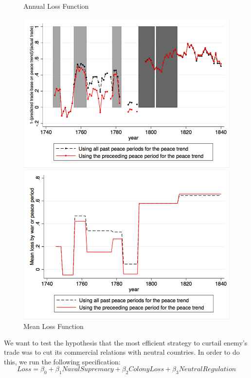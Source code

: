 \documentclass[12pt,a4paper,notitlepage,english]{article}
\begin{document}
\begin{center}
\begin{figure}[H]
\caption{Annual Loss Function}
\label{annual_loss_function}
\includegraphics[scale=.425]{Annual_loss_function.png}
\caption{Mean Loss Function}
\label{mean_loss_function}
\includegraphics[scale=.4]{Mean_loss_function.png}
\end{figure}
\end{center}
We want to test the hypothesis that the most efficient strategy to curtail enemy's trade was to cut its commercial relations with neutral countries. In order to do this, we run the following specification: 
\begin{equation*}
Loss = \beta_0 + \beta_1NavalSupremacy+ \beta_2ColonyLoss+ \beta_3NeutralRegulation
\end{equation*}
\end{document}
